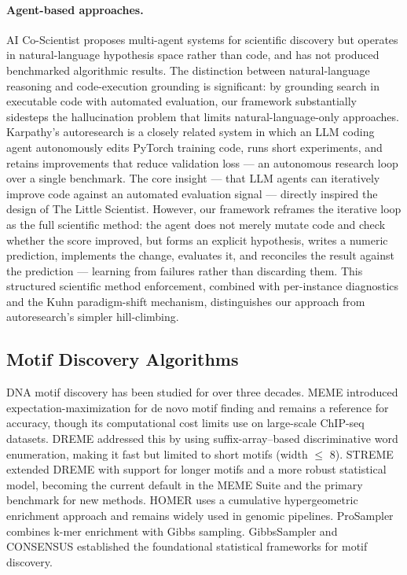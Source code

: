 \documentclass[11pt,a4paper]{article}
\begin{document}
\paragraph{Agent-based approaches.}
AI Co-Scientist \citep{li2026agentic} proposes multi-agent systems for scientific discovery but operates in natural-language hypothesis space rather than code, and has not produced benchmarked algorithmic results. The distinction between natural-language reasoning and code-execution grounding is significant: by grounding search in executable code with automated evaluation, our framework substantially sidesteps the hallucination problem that limits natural-language-only approaches. Karpathy's autoresearch \citep{karpathy2025autoresearch} is a closely related system in which an LLM coding agent autonomously edits PyTorch training code, runs short experiments, and retains improvements that reduce validation loss --- an autonomous research loop over a single benchmark. The core insight --- that LLM agents can iteratively improve code against an automated evaluation signal --- directly inspired the design of The Little Scientist. However, our framework reframes the iterative loop as the full scientific method: the agent does not merely mutate code and check whether the score improved, but forms an explicit hypothesis, writes a numeric prediction, implements the change, evaluates it, and reconciles the result against the prediction --- learning from failures rather than discarding them. This structured scientific method enforcement, combined with per-instance diagnostics and the Kuhn paradigm-shift mechanism, distinguishes our approach from autoresearch's simpler hill-climbing.

\subsection{Motif Discovery Algorithms}

DNA motif discovery has been studied for over three decades. MEME \citep{bailey1994meme} introduced expectation-maximization for de novo motif finding and remains a reference for accuracy, though its computational cost limits use on large-scale ChIP-seq datasets. DREME \citep{bailey2011dreme} addressed this by using suffix-array--based discriminative word enumeration, making it fast but limited to short motifs (width $\leq$ 8). STREME \citep{bailey2021streme} extended DREME with support for longer motifs and a more robust statistical model, becoming the current default in the MEME Suite and the primary benchmark for new methods. HOMER \citep{heinz2010homer} uses a cumulative hypergeometric enrichment approach and remains widely used in genomic pipelines. ProSampler \citep{li2019prosampler} combines k-mer enrichment with Gibbs sampling. GibbsSampler \citep{lawrence1993detecting} and CONSENSUS \citep{hertz1999building} established the foundational statistical frameworks for motif discovery.
\end{document}
